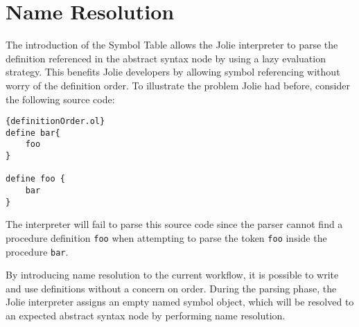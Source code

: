 
\section{ Name Resolution }

The introduction of the Symbol Table allows the Jolie interpreter to parse the definition referenced in the abstract syntax node by using a lazy evaluation strategy. This benefits Jolie developers by allowing symbol referencing without worry of the definition order. To illustrate the problem Jolie had before, consider the following source code:

\begin{listing}[H]
    \lstset{language=Jolie,
        style=codeStyle
    }
    \begin{lstlisting}[frame=tlrb]{definitionOrder.ol}
define bar{
    foo
}

define foo {
    bar
}
\end{lstlisting}
\end{listing}

The interpreter will fail to parse this source code since the parser cannot find a procedure definition \texttt{foo} when attempting to parse the token \texttt{foo} inside the procedure \texttt{bar}.

By introducing name resolution to the current workflow, it is possible to write and use definitions without a concern on order. During the parsing phase, the Jolie interpreter assigns an empty named symbol object, which will be resolved to an expected abstract syntax node by performing name resolution.